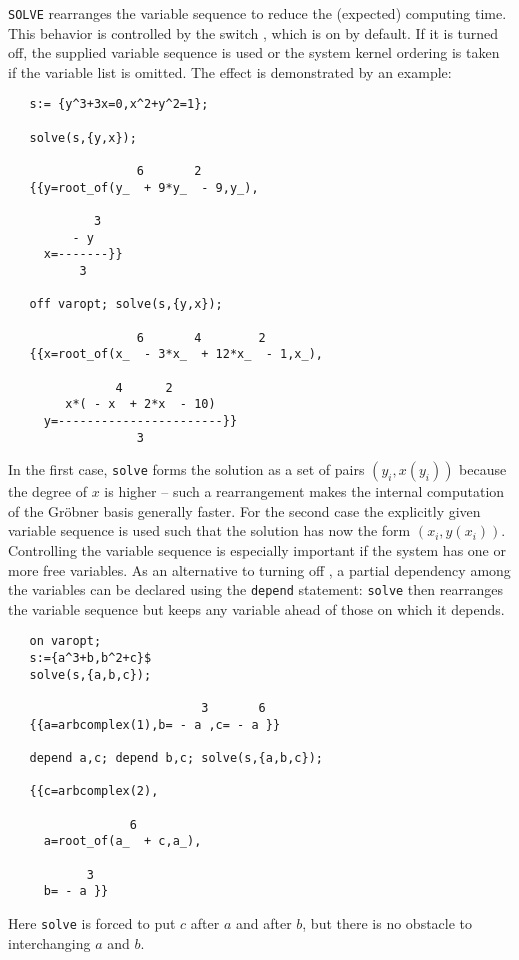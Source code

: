 \hypertarget{switch:VAROPT}{}
\texttt{SOLVE} rearranges the variable sequence
to reduce the (expected) computing time. This behavior is controlled
by the switch , which is on by default.
If it is turned off, the supplied variable sequence is used
or the system kernel ordering is taken if the variable
list is omitted. The effect is demonstrated by an example:
\begin{verbatim}
   s:= {y^3+3x=0,x^2+y^2=1};

   solve(s,{y,x});

                  6       2
   {{y=root_of(y_  + 9*y_  - 9,y_),

            3
         - y
     x=-------}}
          3
 
   off varopt; solve(s,{y,x});

                  6       4        2
   {{x=root_of(x_  - 3*x_  + 12*x_  - 1,x_),

               4      2
        x*( - x  + 2*x  - 10)
     y=-----------------------}}
                  3

\end{verbatim}
In the first case, \texttt{solve} forms the solution as a set of
pairs $(y_i,x(y_i))$ because the degree of $x$ is higher -- 
such a rearrangement makes the internal computation of the Gr\"obner basis
generally faster. For the second case the explicitly given variable sequence
is used such that the solution has now the form $(x_i,y(x_i))$.
Controlling the variable sequence is especially important if
the system has one or more free variables.
As an alternative to turning off , a partial dependency among
the variables can be declared using the \texttt{depend}
statement: \texttt{solve} then rearranges the variable sequence but keeps any
variable ahead of those on which it depends.
\begin{verbatim}
   on varopt;
   s:={a^3+b,b^2+c}$
   solve(s,{a,b,c});

                           3       6
   {{a=arbcomplex(1),b= - a ,c= - a }}

   depend a,c; depend b,c; solve(s,{a,b,c});

   {{c=arbcomplex(2),

                 6
     a=root_of(a_  + c,a_),

           3
     b= - a }}
\end{verbatim}
Here \texttt{solve} is forced to put $c$ after $a$ and after $b$, but
there is no obstacle to interchanging $a$ and $b$.

